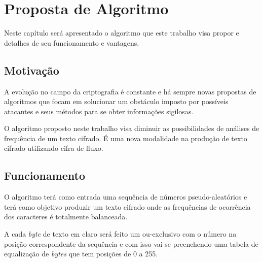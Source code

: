 \chapter{Proposta de Algoritmo}
\label{algorithm-proposition}

Neste capítulo será apresentado o algoritmo que este trabalho visa propor e detalhes de seu funcionamento e vantagens.

\section{Motivação}
\label{motivation}

A evolução no campo da criptografia é constante e há sempre novas propostas de algoritmos que focam em solucionar um obstáculo imposto por possíveis atacantes e seus métodos para se obter informações sigilosas.

O algoritmo proposto neste trabalho visa diminuir as possibilidades de análises de frequência de um texto cifrado. É uma nova modalidade na produção de texto cifrado utilizando cifra de fluxo. 


\section{Funcionamento}
\label{functioning}

O algoritmo terá como entrada uma sequência de números pseudo-aleatórios e terá como objetivo produzir um texto cifrado onde as frequências de ocorrência dos caracteres é totalmente balanceada.

A cada \textit{byte} de texto em claro será feito um ou-exclusivo com o número na posição correspondente da sequência e com isso vai se preenchendo uma tabela de equalização de \textit{bytes} que tem posições de 0 a 255.

